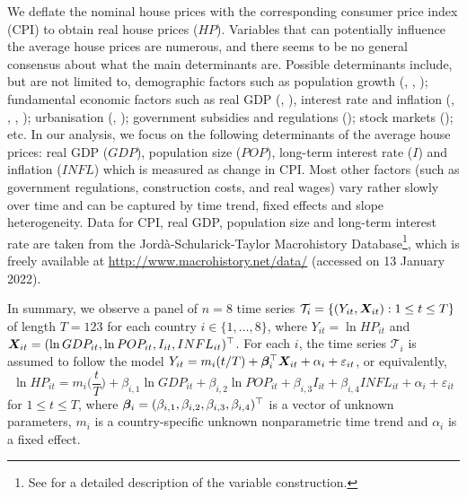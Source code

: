 \documentclass[12pt]{article}
\begin{document}
We deflate the nominal house prices with the corresponding consumer price index (CPI) to obtain real house prices ($HP$). Variables that can potentially influence the average house prices are numerous, and there seems to be no general consensus about what the main determinants are. Possible determinants include, but are not limited to, demographic factors such as population growth (\citealt{Holly2010}, \citealt{Wang2014}, \citealt{Churchill2021}); fundamental economic factors such as real GDP (\citealt{Huang2013}, \citealt{Churchill2021}), interest rate and inflation (\citealt{Abelson2005}, \citealt{Otto2007}, \citealt{Huang2013}, \citealt{Jorda2015}); urbanisation (\citealt{Chen2011}, \citealt{Wang2017}); government subsidies and regulations (\citealt{Malpezzi1999}); stock markets (\citealt{Gallin2006}); etc. In our analysis, we focus on the following determinants of the average house prices: real GDP ($GDP$), population size ($POP$), long-term interest rate ($I$) and inflation ($INFL$) which is measured as change in CPI. Most other factors (such as government regulations, construction costs, and real wages) vary rather slowly over time and can be captured by time trend, fixed effects and slope heterogeneity.
Data for CPI, real GDP, population size and long-term interest rate are taken from the Jordà-Schularick-Taylor Macrohistory Database\footnote{See \cite{Jorda2017} for a detailed description of the variable construction.}, which is freely available at \url{http://www.macrohistory.net/data/} (accessed on 13 January 2022).


In summary, we observe a panel of $n = 8$ time series $\mathcal{T}_i = \{(Y_{it}, \boldsymbol{X}_{it}): 1 \le t \le T \}$ of length $T = 123$ for each country $i \in \{1,\ldots, 8\}$, where $Y_{it} = \ln HP_{it}$ and $\boldsymbol{X}_{it} = (\ln GDP_{it}, \ln POP_{it}, I_{it}, INFL_{it})^\top$. For each $i$, the time series $\mathcal{T}_i$ is assumed to follow the model $Y_{it} = m_i(t/T) + \bm{\beta}^\top_i \boldsymbol{X}_{it} + \alpha_i + \varepsilon_{it}$, or equivalently, 
\begin{equation}\label{eq:model:app4}
\ln HP_{it} =  m_i \Big( \frac{t}{T} \Big) + \beta_{i, 1} \ln GDP_{it} + \beta_{i, 2} \ln POP_{it} + \beta_{i, 3} I_{it} + \beta_{i, 4} INFL_{it} + \alpha_i + \varepsilon_{it}
\end{equation}
for $1 \le t \le T$, where $\bm{\beta}_i = (\beta_{i, 1}, \beta_{i, 2}, \beta_{i, 3}, \beta_{i, 4})^\top$ is a vector of unknown parameters, $m_i$ is a country-specific unknown nonparametric time trend and $\alpha_i$ is a fixed effect. 
\end{document}
